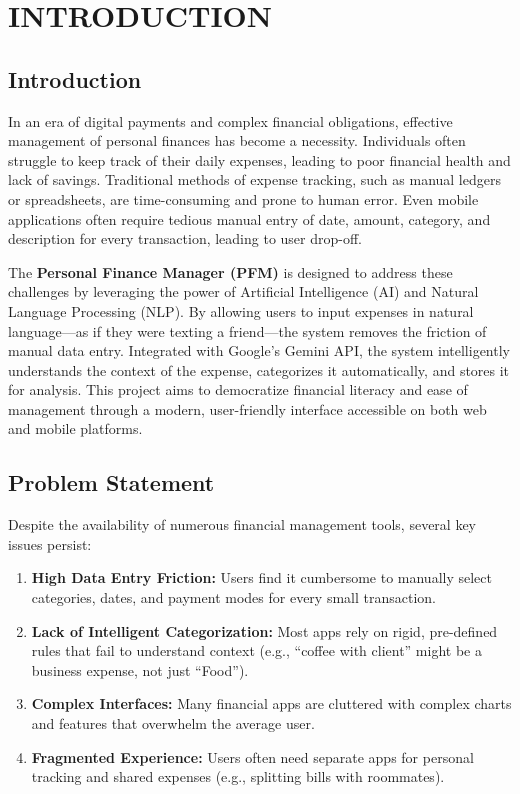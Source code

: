 \chapter{INTRODUCTION}

\section{Introduction}
In an era of digital payments and complex financial obligations, effective management of personal finances has become a necessity. Individuals often struggle to keep track of their daily expenses, leading to poor financial health and lack of savings. Traditional methods of expense tracking, such as manual ledgers or spreadsheets, are time-consuming and prone to human error. Even mobile applications often require tedious manual entry of date, amount, category, and description for every transaction, leading to user drop-off.

The \textbf{Personal Finance Manager (PFM)} is designed to address these challenges by leveraging the power of Artificial Intelligence (AI) and Natural Language Processing (NLP). By allowing users to input expenses in natural language---as if they were texting a friend---the system removes the friction of manual data entry. Integrated with Google's Gemini API, the system intelligently understands the context of the expense, categorizes it automatically, and stores it for analysis. This project aims to democratize financial literacy and ease of management through a modern, user-friendly interface accessible on both web and mobile platforms.

\section{Problem Statement}
Despite the availability of numerous financial management tools, several key issues persist:

\begin{enumerate}
    \item \textbf{High Data Entry Friction:} Users find it cumbersome to manually select categories, dates, and payment modes for every small transaction.
    \item \textbf{Lack of Intelligent Categorization:} Most apps rely on rigid, pre-defined rules that fail to understand context (e.g., ``coffee with client'' might be a business expense, not just ``Food'').
    \item \textbf{Complex Interfaces:} Many financial apps are cluttered with complex charts and features that overwhelm the average user.
    \item \textbf{Fragmented Experience:} Users often need separate apps for personal tracking and shared expenses (e.g., splitting bills with roommates).
\end{enumerate}

